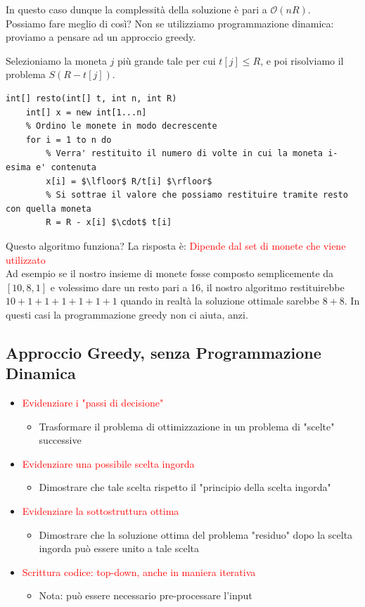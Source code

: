 \documentclass[../cheatSheetAlgoritmi.tex]{subfiles}
\begin{document}
In questo caso dunque la complessità della soluzione è pari a $\mathcal{O}(nR)$.\\
Possiamo fare meglio di così? Non se utilizziamo programmazione dinamica: proviamo a pensare ad un approccio greedy.
\begin{center}
Selezioniamo la moneta $j$ più grande tale per cui $t[j] \leq R$, e poi risolviamo il problema $S(R - t[j])$.
\end{center}
\newpage
\begin{lstlisting}[caption=Resto (Greedy)]
int[] resto(int[] t, int n, int R)
	int[] x = new int[1...n]
	% Ordino le monete in modo decrescente
	for i = 1 to n do
		% Verra' restituito il numero di volte in cui la moneta i-esima e' contenuta
		x[i] = $\lfloor$ R/t[i] $\rfloor$
		% Si sottrae il valore che possiamo restituire tramite resto con quella moneta
		R = R - x[i] $\cdot$ t[i]
\end{lstlisting}
Questo algoritmo funziona? La risposta è: \textcolor{red}{Dipende dal set di monete che viene utilizzato}\\
Ad esempio se il nostro insieme di monete fosse composto semplicemente da $[10, 8, 1]$ e volessimo dare un resto pari a 16, il nostro algoritmo restituirebbe $10 + 1 + 1 + 1+ 1 + 1 + 1$ quando in realtà la soluzione ottimale sarebbe $8 + 8$. In questi casi la programmazione greedy non ci aiuta, anzi.
\subsection{Approccio Greedy, senza Programmazione Dinamica}
\begin{itemize}
	\item \textcolor{red}{Evidenziare i "passi di decisione"}
	\begin{itemize}
		\item Trasformare il problema di ottimizzazione in un problema di
"scelte" successive
	\end{itemize}
	\item \textcolor{red}{Evidenziare una possibile scelta ingorda}
	\begin{itemize}
		\item Dimostrare che tale scelta rispetto il "principio della scelta ingorda"
	\end{itemize}
	\item \textcolor{red}{Evidenziare la sottostruttura ottima}
	\begin{itemize}
		\item Dimostrare che la soluzione ottima del problema "residuo" dopo la
scelta ingorda può essere unito a tale scelta
	\end{itemize}
	\item \textcolor{red}{Scrittura codice: top-down, anche in maniera iterativa}
	\begin{itemize}
		\item Nota: può essere necessario pre-processare l’input
	\end{itemize}
\end{itemize}
\end{document}
